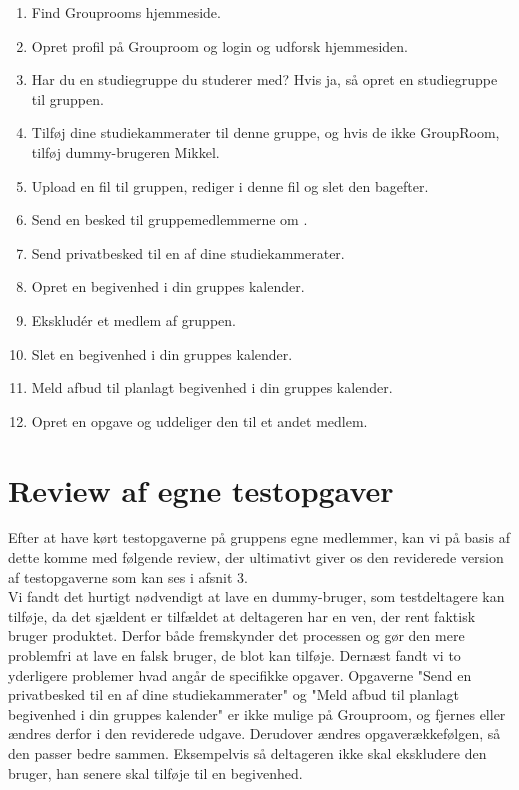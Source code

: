 \documentclass[12pt]{article}
\begin{document}
\begin{enumerate}
\item Find Grouprooms hjemmeside.
\item Opret profil på Grouproom og login og udforsk hjemmesiden.
\item Har du en studiegruppe du studerer med? Hvis ja, så opret en studiegruppe til gruppen.
\item Tilføj dine studiekammerater til denne gruppe, og hvis de ikke GroupRoom, tilføj dummy-brugeren Mikkel.
\item Upload en fil til gruppen, rediger i denne fil og slet den bagefter.
\item Send en besked til gruppemedlemmerne om .
\item Send privatbesked til en af dine studiekammerater.
\item Opret en begivenhed i din gruppes kalender.
\item Ekskludér et medlem af gruppen.
\item Slet en begivenhed i din gruppes kalender.
\item Meld afbud til planlagt begivenhed i din gruppes kalender.
\item Opret en opgave og uddeliger den til et andet medlem.
\end{enumerate}

\newpage

\section{Review af egne testopgaver}

Efter at have kørt testopgaverne på gruppens egne medlemmer, kan vi på basis af dette komme med følgende review, der ultimativt giver os den reviderede version af testopgaverne som kan ses i afsnit 3.\\

\noindent Vi fandt det hurtigt nødvendigt at lave en dummy-bruger, som testdeltagere kan tilføje, da det sjældent er tilfældet at deltageren har en ven, der rent faktisk bruger produktet. Derfor både fremskynder det processen og gør den mere problemfri at lave en falsk bruger, de blot kan tilføje. Dernæst fandt vi to yderligere problemer hvad angår de specifikke opgaver. Opgaverne "Send en privatbesked til en af dine studiekammerater" og "Meld afbud til planlagt begivenhed i din gruppes kalender" er ikke mulige på Grouproom, og fjernes eller ændres derfor i den reviderede udgave. Derudover ændres opgaverækkefølgen, så den passer bedre sammen. Eksempelvis så deltageren ikke skal ekskludere den bruger, han senere skal tilføje til en begivenhed.\\
\end{document}
